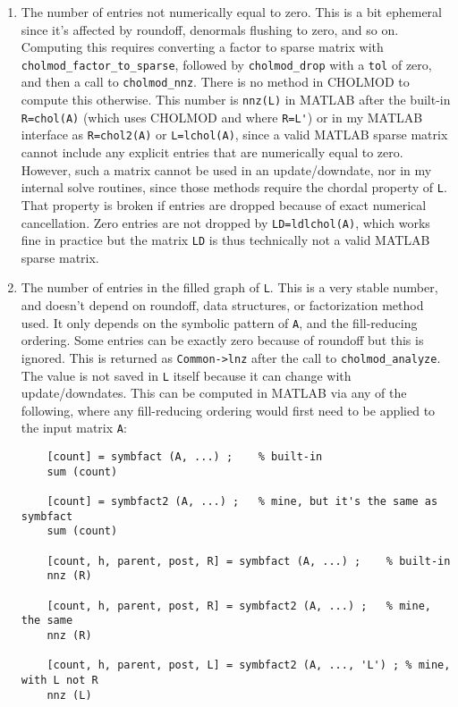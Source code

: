 \documentclass[11pt]{article}
\begin{document}
\begin{enumerate}

\item
The number of entries not numerically equal to zero. This is a bit ephemeral
since it's affected by roundoff, denormals flushing to zero, and so on.
Computing this requires converting a factor to sparse matrix with
\verb'cholmod_factor_to_sparse', followed by \verb'cholmod_drop' with a
\verb'tol' of zero, and then a call to \verb'cholmod_nnz'.  There is no method
in CHOLMOD to compute this otherwise.  This number is \verb'nnz(L)' in MATLAB
after the built-in \verb'R=chol(A)' (which uses CHOLMOD and where \verb"R=L'")
or in my MATLAB interface as \verb'R=chol2(A)' or \verb'L=lchol(A)', since a
valid MATLAB sparse matrix cannot include any explicit entries that are
numerically equal to zero.  However, such a matrix cannot be used in an
update/downdate, nor in my internal solve routines, since those methods require
the chordal property of \verb'L'.  That property is broken if entries are
dropped because of exact numerical cancellation.  Zero entries are not dropped
by \verb'LD=ldlchol(A)', which works fine in practice but the matrix \verb'LD'
is thus technically not a valid MATLAB sparse matrix.

\item
The number of entries in the filled graph of \verb'L'. This is a very stable
number, and doesn't depend on roundoff, data structures, or factorization
method used.  It only depends on the symbolic pattern of \verb'A', and the
fill-reducing ordering.  Some entries can be exactly zero because of roundoff
but this is ignored.  This is returned as \verb'Common->lnz' after the call to
\verb'cholmod_analyze'.  The value is not saved in \verb'L' itself because it
can change with update/downdates.  This can be computed in MATLAB via any
of the following, where any fill-reducing ordering would first need to be
applied to the input matrix \verb'A':

{\small
\begin{verbatim}
    [count] = symbfact (A, ...) ;    % built-in
    sum (count)

    [count] = symbfact2 (A, ...) ;   % mine, but it's the same as symbfact
    sum (count)

    [count, h, parent, post, R] = symbfact (A, ...) ;    % built-in
    nnz (R)

    [count, h, parent, post, R] = symbfact2 (A, ...) ;   % mine, the same
    nnz (R)

    [count, h, parent, post, L] = symbfact2 (A, ..., 'L') ; % mine, with L not R
    nnz (L)
\end{verbatim}}


\end{enumerate}
\end{document}
